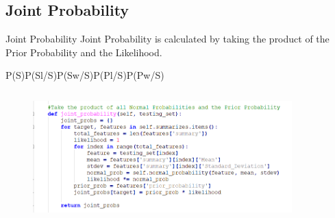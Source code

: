 \documentclass{beamer}
\begin{document}
\subsection{Joint Probability}
    \begin{frame}{Joint Probability}
        \hspace{0.5cm} Joint Probability is calculated by taking the product of the Prior Probability and the Likelihood.
        \begin{center}
            \textcolor[rgb]{1.0,0.0,0.0} {P(S)P(Sl/S)P(Sw/S)P(Pl/S)P(Pw/S)}\\
        \end{center}
        \begin{center}
            \begin{figure}
                \begin{center}
                     \includegraphics[width = 10cm, height = 5cm]{Theme/images/joint_probs.PNG}
                \end{center}
            \end{figure}
        \end{center}
    \end{frame}
\end{document}
